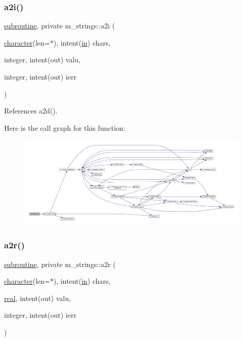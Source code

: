 \subsubsection{\texorpdfstring{a2i()}{a2i()}}
{\footnotesize\ttfamily \hyperlink{M__stopwatch_83_8txt_acfbcff50169d691ff02d4a123ed70482}{subroutine}, private m\+\_\+strings\+::a2i (\begin{DoxyParamCaption}\item[{\hyperlink{option__stopwatch_83_8txt_abd4b21fbbd175834027b5224bfe97e66}{character}(len=$\ast$), intent(\hyperlink{M__journal_83_8txt_afce72651d1eed785a2132bee863b2f38}{in})}]{chars,  }\item[{integer, intent(out)}]{valu,  }\item[{integer, intent(out)}]{ierr }\end{DoxyParamCaption})\hspace{0.3cm}{\ttfamily [private]}}



References a2d().

Here is the call graph for this function\+:
\nopagebreak
\begin{figure}[H]
\begin{center}
\leavevmode
\includegraphics[width=350pt]{namespacem__strings_aca902af295ede82fb0c45174bbfe6eef_cgraph}
\end{center}
\end{figure}
\mbox{\label{namespacem__strings_a6b4babf586dc3586426b13e4bb0fb979}} 
\subsubsection{\texorpdfstring{a2r()}{a2r()}}
{\footnotesize\ttfamily \hyperlink{M__stopwatch_83_8txt_acfbcff50169d691ff02d4a123ed70482}{subroutine}, private m\+\_\+strings\+::a2r (\begin{DoxyParamCaption}\item[{\hyperlink{option__stopwatch_83_8txt_abd4b21fbbd175834027b5224bfe97e66}{character}(len=$\ast$), intent(\hyperlink{M__journal_83_8txt_afce72651d1eed785a2132bee863b2f38}{in})}]{chars,  }\item[{\hyperlink{read__watch_83_8txt_abdb62bde002f38ef75f810d3a905a823}{real}, intent(out)}]{valu,  }\item[{integer, intent(out)}]{ierr }\end{DoxyParamCaption})\hspace{0.3cm}{\ttfamily [private]}}



